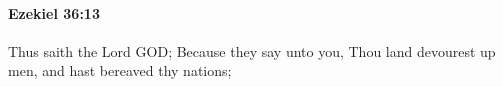
		\paragraph{Ezekiel 36:13} %
			\label{EZEKIEL-36-13}

			Thus saith the Lord GOD; Because they say unto you, Thou land devourest up men, and hast bereaved thy nations;


